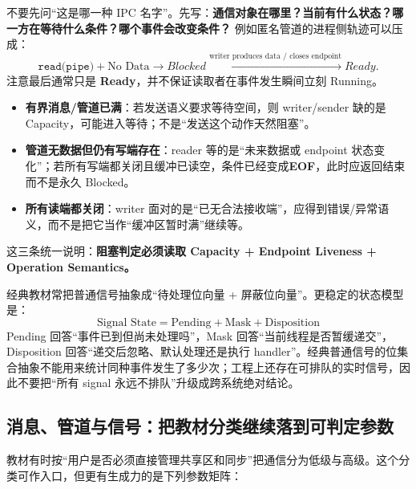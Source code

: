 \documentclass[11pt,a4paper]{ctexart}
\newcommand{\kw}[1]{\textbf{#1}}
\begin{document}
\begin{exam}
不要先问“这是哪一种 IPC 名字”。先写：\kw{通信对象在哪里？当前有什么状态？哪一方在等待什么条件？哪个事件会改变条件？} 例如匿名管道的进程侧轨迹可以压成：
\[
\texttt{read(pipe)}+\text{No Data}
\rightarrow
Blocked
\xrightarrow{\text{writer produces data / closes endpoint}}
Ready.
\]
注意最后通常只是 \kw{Ready}，并不保证读取者在事件发生瞬间立刻 Running。
\end{exam}

\begin{exam}
\begin{itemize}
\item \kw{有界消息/管道已满}：若发送语义要求等待空间，则 writer/sender 缺的是 Capacity，可能进入等待；不是“发送这个动作天然阻塞”。
\item \kw{管道无数据但仍有写端存在}：reader 等的是“未来数据或 endpoint 状态变化”；若所有写端都关闭且缓冲已读空，条件已经变成\kw{EOF}，此时应返回结束而不是永久 Blocked。
\item \kw{所有读端都关闭}：writer 面对的是“已无合法接收端”，应得到错误/异常语义，而不是把它当作“缓冲区暂时满”继续等。
\end{itemize}
这三条统一说明：\kw{阻塞判定必须读取 Capacity + Endpoint Liveness + Operation Semantics。}
\end{exam}

\begin{exam}
经典教材常把普通信号抽象成“待处理位向量 + 屏蔽位向量”。更稳定的状态模型是：
\[
\boxed{\text{Signal State}=\text{Pending}+\text{Mask}+\text{Disposition}}
\]
Pending 回答“事件已到但尚未处理吗”，Mask 回答“当前线程是否暂缓递交”，Disposition 回答“递交后忽略、默认处理还是执行 handler”。经典普通信号的位集合抽象不能用来统计同种事件发生了多少次；工程上还存在可排队的实时信号，因此不要把“所有 signal 永远不排队”升级成跨系统绝对结论。
\end{exam}

\subsection{消息、管道与信号：把教材分类继续落到可判定参数}

教材有时按“用户是否必须直接管理共享区和同步”把通信分为低级与高级。这个分类可作入口，但更有生成力的是下列参数矩阵：
\end{document}
